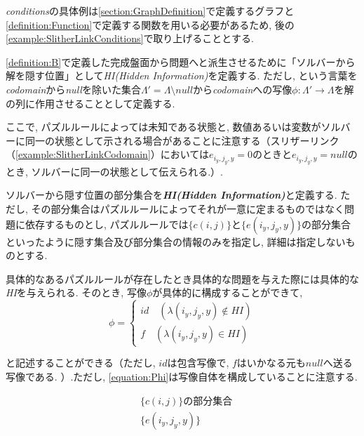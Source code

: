 \textit{conditions}の具体例は\cref{section:GraphDefinition}で定義するグラフと\cref{definition:Function}で定義する関数を用いる必要があるため, 後の\cref{example:SlitherLinkConditions}で取り上げることとする.



\cref{definition:B}で定義した完成盤面から問題へと派生させるために「ソルバーから解を隠す位置」として\textit{HI(Hidden Information)}を定義する.
ただし, という言葉を\textit{codomain}から\textit{null}を除いた集合$\Lambda'=\Lambda \setminus \textit{null}$から\textit{codomain}への写像$\phi\colon \Lambda' \longrightarrow \Lambda$を解の列に作用させることとして定義する.


ここで, パズルルールによっては未知である状態と, 数値あるいは変数がソルバーに同一の状態として示される場合があることに注意する（スリザーリンク（\cref{example:SlitherLinkCodomain}）においては$e_{i_y,j_y,y} = 0$のときと$e_{i_y,j_y,y}=\textit{null}$のとき, ソルバーに同一の状態として伝えられる.）.


\begin{definition}\label{definition:HiddenInformation}
  ソルバーから隠す位置の部分集合を\textbf{\textit{HI(Hidden Information)}}と定義する.
  ただし, その部分集合はパズルルールによってそれが一意に定まるものではなく問題に依存するものとし, パズルルールでは$\{c(i,j)\}$と$\{e(i_y,j_y,y)\}$の部分集合といったように隠す集合及び部分集合の情報のみを指定し, 詳細は指定しないものとする.
\end{definition}

具体的なあるパズルルールが存在したとき具体的な問題を与えた際には具体的な\textit{HI}を与えられる. そのとき, 写像$\phi$が具体的に構成することができて,
\begin{equation}\label{equation:Phi}
  \phi=
  \begin{cases}
    {id \quad (\lambda(i_y,j_y,y) \not\in HI)} \\
    {f \quad (\lambda(i_y,j_y,y) \in HI)}
  \end{cases}
\end{equation}

と記述することができる（ただし, $id$は包含写像で, $f$はいかなる元も$null$へ送る写像である. ）.ただし, \cref{equation:Phi}は写像自体を構成していることに注意する.

\begin{example}
  \begin{align*}
     & \{c(i,j)\}の部分集合  \\
     & \{e(i_y,j_y,y)\}
  \end{align*}
\end{example}

